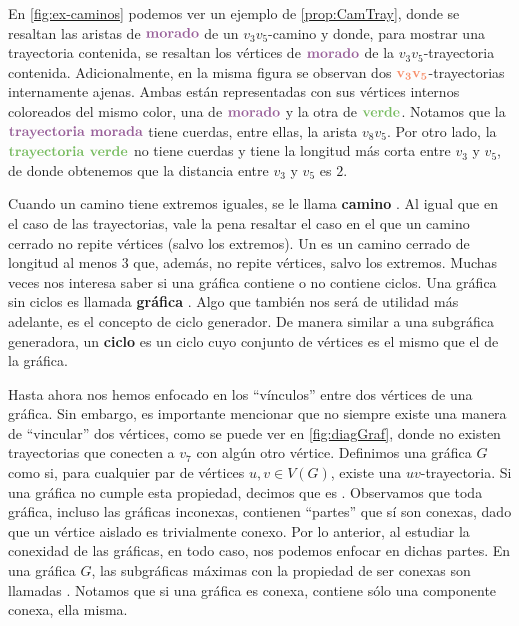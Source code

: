 En \cref{fig:ex-caminos} podemos ver un ejemplo de \cref{prop:CamTray}, donde se
resaltan las aristas de ${\color{morado}\bf morado}$ de un $v_3 v_5$-camino y
donde, para mostrar una trayectoria contenida, se resaltan los v\'ertices de
${\color{morado}\textbf{morado}}$ de la $v_3 v_5$-trayectoria contenida.
Adicionalmente, en la misma figura se observan dos ${\color{coral}\bf v_3
v_5}$-trayectorias internamente ajenas. Ambas est\'an representadas con sus
v\'ertices internos coloreados del mismo color, una de ${\color{morado}\bf
morado}$ y la otra de ${\color{verde}\bf verde}$. Notamos que la
${\color{morado}\textbf{trayectoria morada}}$ tiene cuerdas, entre ellas, la
arista $v_8v_5$. Por otro lado, la ${\color{verde}\textbf{trayectoria verde}}$
no tiene cuerdas y tiene la longitud m\'as corta entre $v_3$ y $v_5$, de donde
obtenemos que la distancia entre $v_3$ y $v_5$ es $2$.

Cuando un camino tiene extremos iguales, se le llama \textbf{camino}
. Al igual que en el caso de las trayectorias, vale
la pena resaltar el caso en el que un camino cerrado no repite v\'ertices (salvo
los extremos). Un  es un camino cerrado de longitud al menos $3$
que, adem\'as, no repite v\'ertices, salvo los extremos.  Muchas veces nos
interesa saber si una gr\'afica contiene o no contiene ciclos. Una gr\'afica sin
ciclos es llamada \textbf{gr\'afica} . Algo que
tambi\'en nos ser\'a de utilidad m\'as adelante, es el concepto de ciclo
generador. De manera similar a una subgr\'afica generadora, un \textbf{ciclo}
 es un ciclo cuyo conjunto de v\'ertices es el mismo
que el de la gr\'afica.
   
Hasta ahora nos hemos enfocado en los ``v\'inculos'' entre dos v\'ertices de una
gr\'afica. Sin embargo, es importante mencionar que no siempre existe una manera
de ``vincular'' dos v\'ertices, como se puede ver en \cref{fig:diagGraf}, donde
no existen trayectorias que conecten a $v_7$ con alg\'un otro v\'ertice.
Definimos una gr\'afica $G$ como
 si, para cualquier par de
v\'ertices $u,v \in V(G)$, existe una $uv$-trayectoria. Si una gr\'afica no
cumple esta propiedad, decimos que es .
Observamos que toda gr\'afica, incluso las gr\'aficas inconexas, contienen
``partes'' que s\'i son conexas, dado que un v\'ertice aislado es trivialmente
conexo. Por lo anterior, al estudiar la conexidad de las gr\'aficas, en todo
caso, nos podemos enfocar en dichas partes. En una gr\'afica $G$, las
subgr\'aficas m\'aximas con la propiedad de ser conexas son llamadas
. Notamos que si una
gr\'afica es conexa, contiene s\'olo una componente conexa, ella misma.


